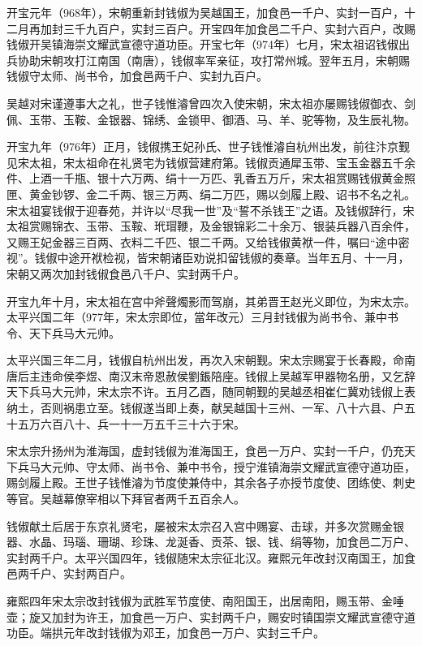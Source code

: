 开宝元年（968年），宋朝重新封钱俶为吴越国王，加食邑一千户、实封一百户，十二月再加封三千九百户，实封三百户。开宝四年加食邑二千户、实封六百户，改赐钱俶开吴镇海崇文耀武宣德守道功臣。开宝七年（974年）七月，宋太祖诏钱俶出兵协助宋朝攻打江南国（南唐），钱俶率军亲征，攻打常州城。翌年五月，宋朝赐钱俶守太师、尚书令，加食邑两千户、实封九百户。

吴越对宋谨遵事大之礼，世子钱惟濬曾四次入使宋朝，宋太祖亦屡赐钱俶御衣、剑佩、玉带、玉鞍、金银器、锦绣、金锁甲、御酒、马、羊、驼等物，及生辰礼物。

开宝九年（976年）正月，钱俶携王妃孙氏、世子钱惟濬自杭州出发，前往汴京觐见宋太祖，宋太祖命在礼贤宅为钱俶营建府第。钱俶贡通犀玉带、宝玉金器五千余件、上酒一千瓶、银十六万两、绢十一万匹、乳香五万斤，宋太祖赏赐钱俶黄金照匣、黄金钞锣、金二千两、银三万两、绢二万匹，赐以剑履上殿、诏书不名之礼。宋太祖宴钱俶于迎春苑，并许以“尽我一世”及“誓不杀钱王”之语。及钱俶辞行，宋太祖赏赐锦衣、玉带、玉鞍、玳瑁鞭，及金银锦彩二十余万、银装兵器八百余件，又赐王妃金器三百两、衣料二千匹、银二千两。又给钱俶黄袱一件，嘱曰“途中密视”。钱俶中途开袱检视，皆宋朝诸臣劝说扣留钱俶的奏章。当年五月、十一月，宋朝又两次加封钱俶食邑八千户、实封两千户。

开宝九年十月，宋太祖在宫中斧聲燭影而驾崩，其弟晋王赵光义即位，为宋太宗。太平兴国二年（977年，宋太宗即位，當年改元）三月封钱俶为尚书令、兼中书令、天下兵马大元帅。

太平兴国三年二月，钱俶自杭州出发，再次入宋朝觐。宋太宗赐宴于长春殿，命南唐后主违命侯李煜、南汉末帝恩赦侯劉鋹陪座。钱俶上吴越军甲器物名册，又乞辞天下兵马大元帅，宋太宗不许。五月乙酉，随同朝觐的吴越丞相崔仁冀劝钱俶上表纳土，否则祸患立至。钱俶遂当即上奏，献吴越国十三州、一军、八十六县、户五十五万六百八十、兵一十一万五千三十六于宋。

宋太宗升扬州为淮海国，虚封钱俶为淮海国王，食邑一万户、实封一千户，仍充天下兵马大元帅、守太师、尚书令、兼中书令，授宁淮镇海崇文耀武宣德守道功臣，赐剑履上殿。王世子钱惟濬为节度使兼侍中，其余各子亦授节度使、团练使、刺史等官。吴越幕僚宰相以下拜官者两千五百余人。

钱俶献土后居于东京礼贤宅，屡被宋太宗召入宫中赐宴、击球，并多次赏赐金银器、水晶、玛瑙、珊瑚、珍珠、龙涎香、贡茶、银、钱、绢等物，加食邑二万户、实封两千户。太平兴国四年，钱俶随宋太宗征北汉。雍熙元年改封汉南国王，加食邑两千户、实封两百户。

雍熙四年宋太宗改封钱俶为武胜军节度使、南阳国王，出居南阳，赐玉带、金唾壶；旋又加封为许王，加食邑一万户、实封两千户，赐安时镇国崇文耀武宣德守道功臣。端拱元年改封钱俶为邓王，加食邑一万户、实封三千户。

